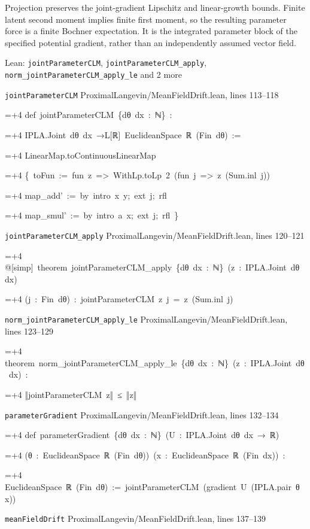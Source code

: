 \documentclass[11pt,a4paper]{report}
\newlength{\leancharwidth}
\newenvironment{leancode}{\par\smallskip\begingroup\ttfamily\footnotesize\raggedright
  \settowidth{\leancharwidth}{M}\setlength{\parskip}{0pt}\setlength{\parindent}{0pt}
  \frenchspacing}{\par\endgroup\smallskip}
\newcommand{\leanline}[2]{\hangindent=\dimexpr#1\leancharwidth+4\leancharwidth\relax
  \hangafter=1\noindent\hspace*{#1\leancharwidth}#2\par}
\newcommand{\leansource}[1]{\par{\footnotesize\color{leanmuted}#1}\par}
\begin{document}
Projection preserves the joint-gradient Lipschitz and linear-growth bounds. Finite latent second moment implies finite first moment, so the resulting parameter force is a finite Bochner expectation. It is the integrated parameter block of the specified potential gradient, rather than an independently assumed vector field.

\begin{leanbox}{Lean: \texttt{jointParameterCLM}, \texttt{jointParameterCLM\_\allowbreak{}apply}, \texttt{norm\_\allowbreak{}jointParameterCLM\_\allowbreak{}apply\_\allowbreak{}le} and 2 more}
\leansource{\texttt{jointParameterCLM} \quad ProximalLangevin/\allowbreak{}MeanFieldDrift.lean, lines 113–118}
\begin{leancode}
\leanline{0}{def\ jointParameterCLM\ \{dθ\ dx\ :\ ℕ\}\ :}
\leanline{4}{IPLA.Joint\ dθ\ dx\ →L[ℝ]\ EuclideanSpace\ ℝ\ (Fin\ dθ)\ :=}
\leanline{2}{LinearMap.toContinuousLinearMap}
\leanline{4}{\{\ toFun\ :=\ fun\ z\ =>\ WithLp.toLp\ 2\ (fun\ j\ =>\ z\ (Sum.inl\ j))}
\leanline{6}{map\_add'\ :=\ by\ intro\ x\ y;\ ext\ j;\ rfl}
\leanline{6}{map\_smul'\ :=\ by\ intro\ a\ x;\ ext\ j;\ rfl\ \}}
\end{leancode}
\leansource{\texttt{jointParameterCLM\_\allowbreak{}apply} \quad ProximalLangevin/\allowbreak{}MeanFieldDrift.lean, lines 120–121}
\begin{leancode}
\leanline{0}{@[simp]\ theorem\ jointParameterCLM\_apply\ \{dθ\ dx\ :\ ℕ\}\ (z\ :\ IPLA.Joint\ dθ\ dx)}
\leanline{4}{(j\ :\ Fin\ dθ)\ :\ jointParameterCLM\ z\ j\ =\ z\ (Sum.inl\ j)}
\end{leancode}
\leansource{\texttt{norm\_\allowbreak{}jointParameterCLM\_\allowbreak{}apply\_\allowbreak{}le} \quad ProximalLangevin/\allowbreak{}MeanFieldDrift.lean, lines 123–129}
\begin{leancode}
\leanline{0}{theorem\ norm\_jointParameterCLM\_apply\_le\ \{dθ\ dx\ :\ ℕ\}\ (z\ :\ IPLA.Joint\ dθ\ dx)\ :}
\leanline{4}{‖jointParameterCLM\ z‖\ ≤\ ‖z‖}
\end{leancode}
\leansource{\texttt{parameterGradient} \quad ProximalLangevin/\allowbreak{}MeanFieldDrift.lean, lines 132–134}
\begin{leancode}
\leanline{0}{def\ parameterGradient\ \{dθ\ dx\ :\ ℕ\}\ (U\ :\ IPLA.Joint\ dθ\ dx\ →\ ℝ)}
\leanline{4}{(θ\ :\ EuclideanSpace\ ℝ\ (Fin\ dθ))\ (x\ :\ EuclideanSpace\ ℝ\ (Fin\ dx))\ :}
\leanline{4}{EuclideanSpace\ ℝ\ (Fin\ dθ)\ :=\ jointParameterCLM\ (gradient\ U\ (IPLA.pair\ θ\ x))}
\end{leancode}
\leansource{\texttt{meanFieldDrift} \quad ProximalLangevin/\allowbreak{}MeanFieldDrift.lean, lines 137–139}

\end{leanbox}
\end{document}
